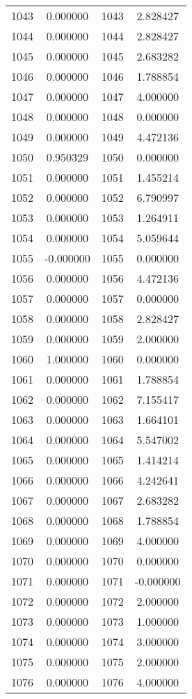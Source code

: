 \documentclass[12pt]{article}
\begin{document}
\begin{longtable}{@{}cccc@{}}
1043 & 0.000000 & 1043 & 2.828427 \\
1044 & 0.000000 & 1044 & 2.828427 \\
1045 & 0.000000 & 1045 & 2.683282 \\
1046 & 0.000000 & 1046 & 1.788854 \\
1047 & 0.000000 & 1047 & 4.000000 \\
1048 & 0.000000 & 1048 & 0.000000 \\
1049 & 0.000000 & 1049 & 4.472136 \\
1050 & 0.950329 & 1050 & 0.000000 \\
1051 & 0.000000 & 1051 & 1.455214 \\
1052 & 0.000000 & 1052 & 6.790997 \\
1053 & 0.000000 & 1053 & 1.264911 \\
1054 & 0.000000 & 1054 & 5.059644 \\
1055 & -0.000000 & 1055 & 0.000000 \\
1056 & 0.000000 & 1056 & 4.472136 \\
1057 & 0.000000 & 1057 & 0.000000 \\
1058 & 0.000000 & 1058 & 2.828427 \\
1059 & 0.000000 & 1059 & 2.000000 \\
1060 & 1.000000 & 1060 & 0.000000 \\
1061 & 0.000000 & 1061 & 1.788854 \\
1062 & 0.000000 & 1062 & 7.155417 \\
1063 & 0.000000 & 1063 & 1.664101 \\
1064 & 0.000000 & 1064 & 5.547002 \\
1065 & 0.000000 & 1065 & 1.414214 \\
1066 & 0.000000 & 1066 & 4.242641 \\
1067 & 0.000000 & 1067 & 2.683282 \\
1068 & 0.000000 & 1068 & 1.788854 \\
1069 & 0.000000 & 1069 & 4.000000 \\
1070 & 0.000000 & 1070 & 0.000000 \\
1071 & 0.000000 & 1071 & -0.000000 \\
1072 & 0.000000 & 1072 & 2.000000 \\
1073 & 0.000000 & 1073 & 1.000000 \\
1074 & 0.000000 & 1074 & 3.000000 \\
1075 & 0.000000 & 1075 & 2.000000 \\
1076 & 0.000000 & 1076 & 4.000000 \\

\end{longtable}
\end{document}
